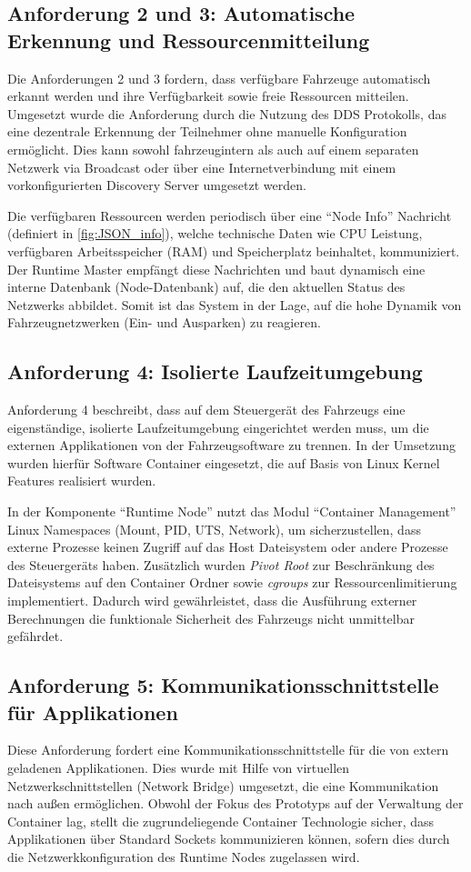\subsection{Anforderung 2 und 3: Automatische Erkennung und Ressourcenmitteilung}
Die Anforderungen 2 und 3 fordern, dass verfügbare Fahrzeuge automatisch erkannt werden und ihre Verfügbarkeit sowie freie Ressourcen mitteilen. Umgesetzt wurde die Anforderung durch die Nutzung des \gls{DDS} Protokolls, das eine dezentrale Erkennung der Teilnehmer ohne manuelle Konfiguration ermöglicht. Dies kann sowohl fahrzeugintern als auch auf einem separaten Netzwerk via Broadcast oder über eine Internetverbindung mit einem vorkonfigurierten Discovery Server umgesetzt werden. 

Die verfügbaren Ressourcen werden periodisch über eine \enquote{Node Info} Nachricht (definiert in \autoref{fig:JSON_info}), welche technische Daten wie CPU Leistung, verfügbaren Arbeitsspeicher (RAM) und Speicherplatz beinhaltet, kommuniziert. Der Runtime Master empfängt diese Nachrichten und baut dynamisch eine interne Datenbank (Node-Datenbank) auf, die den aktuellen Status des Netzwerks abbildet. Somit ist das System in der Lage, auf die hohe Dynamik von Fahrzeugnetzwerken (Ein- und Ausparken) zu reagieren.

\subsection{Anforderung 4: Isolierte Laufzeitumgebung}
Anforderung 4 beschreibt, dass auf dem Steuergerät des Fahrzeugs eine eigenständige, isolierte Laufzeitumgebung eingerichtet werden muss, um die externen Applikationen von der Fahrzeugsoftware zu trennen. In der Umsetzung wurden hierfür Software Container eingesetzt, die auf Basis von Linux Kernel Features realisiert wurden. 

In der Komponente \enquote{Runtime Node} nutzt das Modul \enquote{Container Management} Linux Namespaces (Mount, PID, UTS, Network), um sicherzustellen, dass externe Prozesse keinen Zugriff auf das Host Dateisystem oder andere Prozesse des Steuergeräts haben. Zusätzlich wurden \textit{Pivot Root} zur Beschränkung des Dateisystems auf den Container Ordner sowie \textit{cgroups} zur Ressourcenlimitierung implementiert. Dadurch wird gewährleistet, dass die Ausführung externer Berechnungen die funktionale Sicherheit des Fahrzeugs nicht unmittelbar gefährdet.

\subsection{Anforderung 5: Kommunikationsschnittstelle für Applikationen}
Diese Anforderung fordert eine Kommunikationsschnittstelle für die von extern geladenen Applikationen. Dies wurde mit Hilfe von virtuellen Netzwerkschnittstellen (Network Bridge) umgesetzt, die eine Kommunikation nach außen ermöglichen. Obwohl der Fokus des Prototyps auf der Verwaltung der Container lag, stellt die zugrundeliegende Container Technologie sicher, dass Applikationen über Standard Sockets kommunizieren können, sofern dies durch die Netzwerkkonfiguration des Runtime Nodes zugelassen wird.

